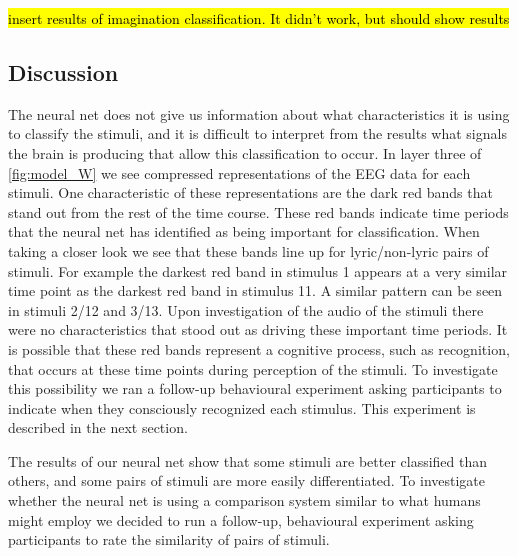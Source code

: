 \hl{insert results of imagination classification. It didn't work, but should show results}

\subsection*{Discussion}
The neural net does not give us information about what characteristics it is using to classify the stimuli, and it is difficult to interpret from the results what signals the brain is producing that allow this classification to occur. 
In layer three of \autoref{fig:model_W} we see compressed representations of the EEG data for each stimuli. 
One characteristic of these representations are the dark red bands that stand out from the rest of the time course. 
These red bands indicate time periods that the neural net has identified as being important for classification. 
When taking a closer look we see that these bands line up for lyric/non-lyric pairs of stimuli. 
For example the darkest red band in stimulus 1 appears at a very similar time point as the darkest red band in stimulus 11.
A similar pattern can be seen in stimuli 2/12 and 3/13.
Upon investigation of the audio of the stimuli there were no characteristics that stood out as driving these important time periods.
It is possible that these red bands represent a cognitive process, such as recognition, that occurs at these time points during perception of the stimuli. 
To investigate this possibility we ran a follow-up behavioural experiment asking participants to indicate when they consciously recognized each stimulus. 
This experiment is described in the next section.

The results of our neural net show that some stimuli are better classified than others, and some pairs of stimuli are more easily differentiated. 
To investigate whether the neural net is using a comparison system similar to what humans might employ we decided to run a follow-up, behavioural experiment asking participants to rate the similarity of pairs of stimuli. 

